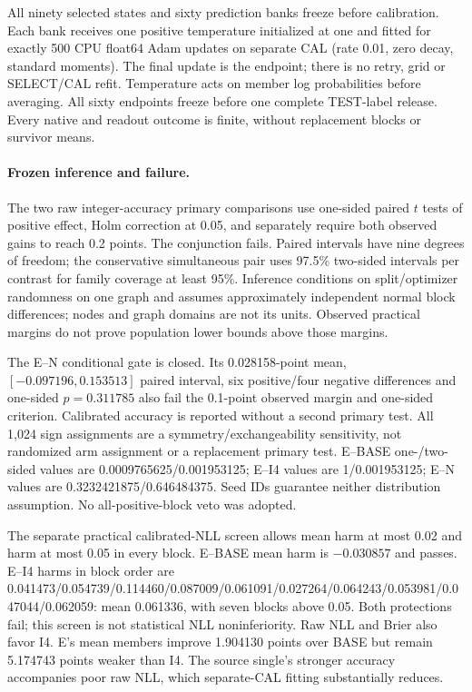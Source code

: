 All ninety selected states and sixty prediction banks freeze before calibration. Each bank receives one positive temperature initialized at one and fitted for exactly 500 CPU float64 Adam updates on separate CAL (rate 0.01, zero decay, standard moments). The final update is the endpoint; there is no retry, grid or SELECT/CAL refit. Temperature acts on member log probabilities before averaging. All sixty endpoints freeze before one complete TEST-label release. Every native and readout outcome is finite, without replacement blocks or survivor means.



\paragraph{Frozen inference and failure.}
The two raw integer-accuracy primary comparisons use one-sided paired $t$ tests of positive effect, Holm correction at 0.05, and separately require both observed gains to reach 0.2 points. The conjunction fails. Paired intervals have nine degrees of freedom; the conservative simultaneous pair uses 97.5\% two-sided intervals per contrast for family coverage at least 95\%. Inference conditions on split/optimizer randomness on one graph and assumes approximately independent normal block differences; nodes and graph domains are not its units. Observed practical margins do not prove population lower bounds above those margins.



The E--N conditional gate is closed. Its 0.028158-point mean, $[-0.097196,0.153513]$ paired interval, six positive/four negative differences and one-sided $p=0.311785$ also fail the 0.1-point observed margin and one-sided criterion. Calibrated accuracy is reported without a second primary test. All 1,024 sign assignments are a symmetry/exchangeability sensitivity, not randomized arm assignment or a replacement primary test. E--BASE one-/two-sided values are 0.0009765625/0.001953125; E--I4 values are 1/0.001953125; E--N values are 0.3232421875/0.646484375. Seed IDs guarantee neither distribution assumption. No all-positive-block veto was adopted.

The separate practical calibrated-NLL screen allows mean harm at most 0.02 and harm at most 0.05 in every block. E--BASE mean harm is $-0.030857$ and passes. E--I4 harms in block order are 0.041473/0.054739/0.114460/0.087009/0.061091/0.027264/0.064243/0.053981/0.047044/0.062059: mean 0.061336, with seven blocks above 0.05. Both protections fail; this screen is not statistical NLL noninferiority. Raw NLL and Brier also favor I4. E's mean members improve 1.904130 points over BASE but remain 5.174743 points weaker than I4. The source single's stronger accuracy accompanies poor raw NLL, which separate-CAL fitting substantially reduces.

